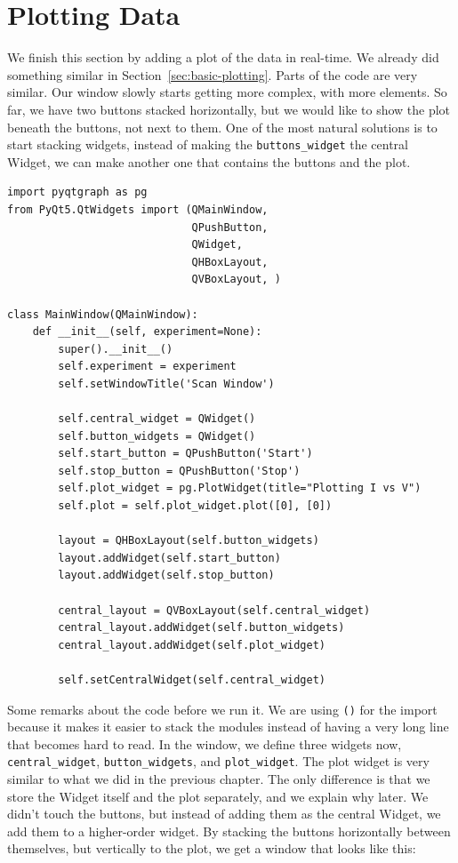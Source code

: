 

\section{Plotting Data}\label{sec:plotting-data}
We finish this section by adding a plot of the data in real-time. We already did something similar in Section~\ref{sec:basic-plotting}. Parts of the code are very similar. Our window slowly starts getting more complex, with more elements. So far, we have two buttons stacked horizontally, but we would like to show the plot beneath the buttons, not next to them. One of the most natural solutions is to start stacking widgets, instead of making the \texttt{buttons\_widget} the central Widget, we can make another one that contains the buttons and the plot.

\begin{verbatim}
import pyqtgraph as pg
from PyQt5.QtWidgets import (QMainWindow,
                             QPushButton,
                             QWidget,
                             QHBoxLayout,
                             QVBoxLayout, )

class MainWindow(QMainWindow):
    def __init__(self, experiment=None):
        super().__init__()
        self.experiment = experiment
        self.setWindowTitle('Scan Window')

        self.central_widget = QWidget()
        self.button_widgets = QWidget()
        self.start_button = QPushButton('Start')
        self.stop_button = QPushButton('Stop')
        self.plot_widget = pg.PlotWidget(title="Plotting I vs V")
        self.plot = self.plot_widget.plot([0], [0])

        layout = QHBoxLayout(self.button_widgets)
        layout.addWidget(self.start_button)
        layout.addWidget(self.stop_button)

        central_layout = QVBoxLayout(self.central_widget)
        central_layout.addWidget(self.button_widgets)
        central_layout.addWidget(self.plot_widget)

        self.setCentralWidget(self.central_widget)
\end{verbatim}

Some remarks about the code before we run it. We are using \texttt{()} for the import because it makes it easier to stack the modules instead of having a very long line that becomes hard to read. In the window, we define three widgets now, \texttt{central\_widget}, \texttt{button\_widgets}, and \texttt{plot\_widget}. The plot widget is very similar to what we did in the previous chapter. The only difference is that we store the Widget itself and the plot separately, and we explain why later. We didn't touch the buttons, but instead of adding them as the central Widget, we add them to a higher-order widget. By stacking the buttons horizontally between themselves, but vertically to the plot, we get a window that looks like this:

